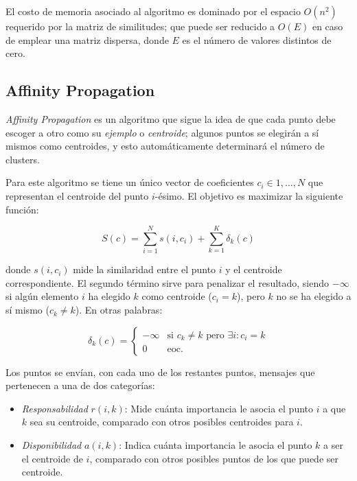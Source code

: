 El costo de memoria asociado al algoritmo es dominado por el espacio $O(n^2)$ requerido por la matriz de similitudes;
que puede ser reducido a $O(E)$ en caso de emplear una matriz dispersa, donde $E$ es el número de valores distintos de cero.

\subsection{Affinity Propagation}\label{subsec:affinityPropagation}

\textit{Affinity Propagation} es un algoritmo que sigue la idea de que cada punto debe escoger a otro como su \textit{ejemplo} o \textit{centroide};
algunos puntos se elegirán a sí mismos como centroides, y esto automáticamente determinará el número de clusters.

Para este algoritmo se tiene un único vector de coeficientes $c_i \in {1,\dots,N}$ que representan el centroide del punto $i$-ésimo.
El objetivo es maximizar la siguiente función:

\begin{equation}
    \label{eq:affinity-propagation}
    S(c) = \sum_{i=1}^{N}s(i,c_i) + \sum_{k=1}^{K}{\delta_k(c)}
\end{equation}

\noindent
donde $s(i, c_i)$ mide la similaridad entre el punto $i$ y el centroide correspondiente.
El segundo término sirve para penalizar el resultado, siendo $-\infty$ si algún elemento $i$ ha elegido $k$ como centroide ($c_i = k$), pero $k$ no se ha elegido a sí mismo ($c_k \neq k$).
En otras palabras:

\begin{equation}
    \label{affinity-propagation-penalty}
    \delta_k(c) = \begin{cases}
                      -\infty & \text{si $c_k \neq k$ pero $\exists i: c_i = k$} \\
                      0 & \text{eoc.}
    \end{cases}
\end{equation}

Los puntos se envían, con cada uno de los restantes puntos, mensajes que pertenecen a una de dos categorías:
\begin{itemize}
    \item \textit{Responsabilidad} $r(i, k)$: Mide cuánta importancia le asocia el punto $i$ a que $k$ sea su centroide, comparado con otros posibles centroides para $i$.
    \item \textit{Disponibilidad} $a(i, k)$: Indica cuánta importancia le asocia el punto $k$ a ser el centroide de $i$, comparado con otros posibles puntos de los que puede ser centroide.
\end{itemize}

